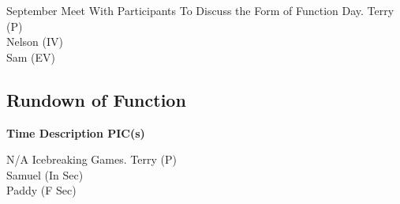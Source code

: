 \bTR{}
\eTD{} September
\eTD\bTD Meet With Participants To Discuss the Form of Function Day.
\eTD\bTD Terry (P) \\ Nelson (IV) \\ Sam (EV)
\eTD\eTR

\eTABLEbody
\eTABLE

\pagebreak
\subsection{Rundown of Function}

\setupTABLE[c][1][width=1.25in]
\setupTABLE[c][2][width=3.5in]
\setupTABLE[c][3][width=1.25in]
\bTABLE
\bTABLEhead

\bTR\bTH    \bf{Time}
\eTH\bTH    \bf{Description}
\eTH\bTH    \bf{PIC(s)}
\eTH\eTR

\eTABLEhead
\bTABLEbody

\bTR\bTD N/A
\eTD\bTD Icebreaking Games.
\eTD\bTD Terry (P) \\ Samuel (In Sec) \\ Paddy (F Sec)
\eTD\eTR

\eTABLEbody
\eTABLE

\stopsection
\pagebreak
